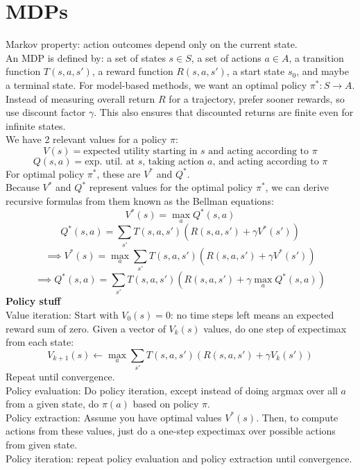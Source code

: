 \section{MDPs}
Markov property: action outcomes depend only on the current state. \\
An MDP is defined by: a set of states $s\in S$, a set of actions $a\in A$, a transition function $T(s,a,s')$, a reward function $R(s,a,s')$, a start state $s_0$, and maybe a terminal state. For model-based methods, we want an optimal policy $\pi^*:S\rightarrow A$. \\
Instead of measuring overall return $R$ for a trajectory, prefer sooner rewards, so use discount factor $\gamma$. This also ensures that discounted returns are finite even for infinite states. \\
We have 2 relevant values for a policy $\pi$:
$$V(s)=\text{expected utility starting in $s$ and acting according to $\pi$}$$
$$Q(s, a)=\text{exp. util. at $s$, taking action $a$, and acting according to $\pi$}$$
For optimal policy $\pi^*$, these are $V^*$ and $Q^*$. \\
Because $V^*$ and $Q^*$ represent values for the optimal policy $\pi^*$, we can derive recursive formulas from them known as the Bellman equations:
$$V^*(s)=\max_{a}Q^*(s,a)$$
$$Q^*(s,a)=\sum_{s'}T(s,a,s')\left(R(s,a,s')+\gamma V^*(s')\right)$$
$$\implies V^*(s)=\max_{a}\sum_{s'}T(s,a,s')\left(R(s,a,s')+\gamma V^*(s')\right)$$
$$\implies Q^*(s,a)=\sum_{s'}T(s,a,s')\left(R(s,a,s')+\gamma\max_{a}Q^*(s,a)\right)$$
\textbf{Policy stuff} \\
Value iteration: Start with $V_{0}(s)=0$: no time steps left means an expected reward sum of zero. Given a vector of $V_k(s)$ values, do one step of expectimax from each state:
$$V_{k+1}(s)\leftarrow\max_{a}\sum_{s'}T(s,a,s')\left(R(s,a,s')+\gamma V_k(s')\right)$$
Repeat until convergence. \\
Policy evaluation: Do policy iteration, except instead of doing argmax over all $a$ from a given state, do $\pi(a)$ based on policy $\pi$. \\
Policy extraction: Assume you have optimal values $V^*(s)$. Then, to compute actions from these values, just do a one-step expectimax over possible actions from given state. \\
Policy iteration: repeat policy evaluation and policy extraction until convergence. \\